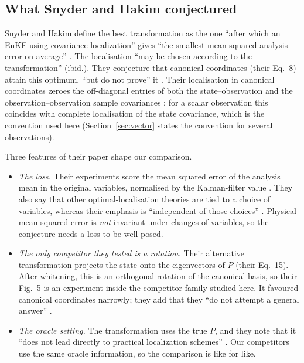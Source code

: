 \documentclass[11pt,a4paper]{article}
\numberwithin{equation}{section}
\theoremstyle{remark}\newtheorem{remark}[theorem]{Remark}
\begin{document}
\subsection{What Snyder and Hakim conjectured}\label{sec:conjecture}

Snyder and Hakim define the best transformation as the one ``after which an EnKF using
covariance localization'' gives ``the smallest mean-squared analysis error on average''
\cite[Section~3]{SnyderHakim2022}. The localisation ``may be chosen according to the
transformation'' (ibid.). They conjecture that canonical coordinates (their Eq.~8) attain
this optimum, ``but do not prove'' it \cite[Sections~1 and~7]{SnyderHakim2022}. Their
localisation in canonical coordinates zeroes the off-diagonal entries of both the
state--observation and the observation--observation sample covariances
\cite[Section~3.2]{SnyderHakim2022}; for a scalar observation this coincides with complete
localisation of the state covariance, which is the convention used here (Section~\ref{sec:vector}
states the convention for several observations).

Three features of their paper shape our comparison.
\begin{itemize}
\item \emph{The loss.} Their experiments score the mean squared error of the analysis mean in the
 original variables, normalised by the Kalman-filter value \cite[Section~4, Figs~3
 and~5]{SnyderHakim2022}. They also say that other optimal-localisation theories are tied to
 a choice of variables, whereas their emphasis is ``independent of those choices''
 \cite[Section~1]{SnyderHakim2022}. Physical mean squared error is \emph{not} invariant under
 changes of variables, so the conjecture needs a loss to be well posed.
\item \emph{The only competitor they tested is a rotation.} Their alternative transformation
 projects the state onto the eigenvectors of \(P\) (their Eq.~15). After whitening, this is an
 orthogonal rotation of the canonical basis, so their Fig.~5 is an experiment inside the
 competitor family studied here. It favoured canonical coordinates narrowly; they add that
 they ``do not attempt a general answer'' \cite[Section~4]{SnyderHakim2022}.
\item \emph{The oracle setting.} The transformation uses the true \(P\), and they note that it
 ``does not lead directly to practical localization schemes'' \cite[Section~1]{SnyderHakim2022}.
 Our competitors use the same oracle information, so the comparison is like for like.
\end{itemize}
\end{document}
